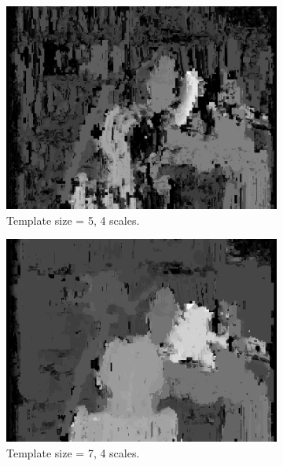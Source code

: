 \documentclass[12pt,a4paper,oneside,final]{article}
\begin{document}
	\begin{figure}[H]
		\ContinuedFloat
		\begin{subfigure}[b]{0.24\textwidth}
			\includegraphics[width=\textwidth]{disparity_s4_k5set_1.png}
			\caption{Template size = 5, 4 scales.}
		\end{subfigure}
		\begin{subfigure}[b]{0.24\textwidth}
			\includegraphics[width=\textwidth]{disparity_s4_k7set_1.png}
			\caption{Template size = 7, 4 scales.}
		\end{subfigure}
		\begin{subfigure}[b]{0.24\textwidth}

\end{subfigure}
\end{figure}
\end{document}
